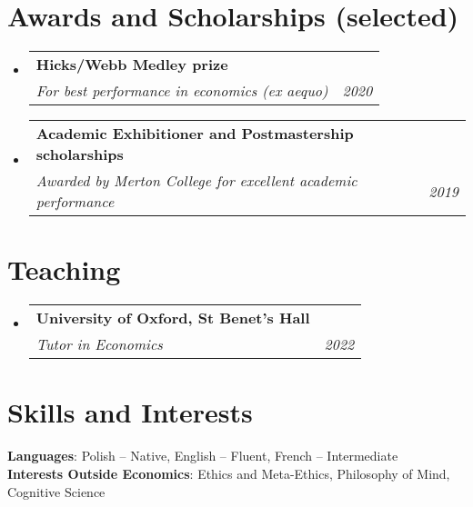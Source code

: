 \documentclass[letterpaper,11pt]{article}
\makeatletter
\newcommand{\resumeSubheading}[3]{
  \vspace{-2pt}\item
    \begin{tabular*}{0.97\textwidth}[t]{l@{\extracolsep{\fill}}r}
      \textbf{#1} \\
      \textit{\small#2} & \textit{\small #3} \\
    \end{tabular*}\vspace{-7pt}
}
\newcommand{\resumeSubHeadingListStart}{\begin{itemize}[leftmargin=0.15in, label={}]}
\newcommand{\resumeSubHeadingListEnd}{\end{itemize}}
\makeatother
\begin{document}
\bigskip



\section{Awards and Scholarships (selected)}
  \resumeSubHeadingListStart
     \resumeSubheading
      {Hicks/Webb Medley prize}
      {For best performance in economics (ex aequo)}{2020}
\newline
     \resumeSubheading
      {Academic Exhibitioner and Postmastership scholarships}
      {Awarded by Merton College for excellent academic performance}{2019}
  \resumeSubHeadingListEnd

\bigskip




\section{Teaching}
  \resumeSubHeadingListStart
     \resumeSubheading
      {University of Oxford, St Benet’s Hall}
      {Tutor in Economics}{2022}
  \resumeSubHeadingListEnd

\bigskip




\section{Skills and Interests}
 \begin{itemize}[leftmargin=0.15in, label={}]
    \small{\item{
     \textbf{Languages}{: Polish -- Native, English -- Fluent, French -- Intermediate} \\
     \textbf{Interests Outside Economics}{: Ethics and Meta-Ethics, Philosophy of Mind, Cognitive Science} \\
    }}
    
 \end{itemize}
 
    
\end{document}
